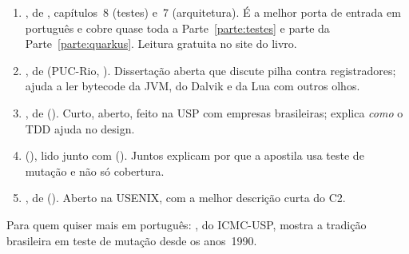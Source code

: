 \begin{enumerate}
\item {} \pt, de \citeauthor{livro:valente2020},
  capítulos~8 (testes) e~7 (arquitetura). É a melhor porta de
  entrada em português e cobre quase toda a Parte~\ref{parte:testes} e parte da Parte~\ref{parte:quarkus}.
  Leitura gratuita no site do livro.
\item {} \pt, de
  \citeauthor{paper:hazan-maquina-registradores-java} (PUC-Rio,
  \citeyear{paper:hazan-maquina-registradores-java}). Dissertação aberta que
  discute pilha contra registradores; ajuda a ler bytecode da JVM, do Dalvik
  e da Lua com outros olhos.
\item {}, de
  \citeauthor{paper:aniche-tdd-class-design-jbcs-2015}
  (\citeyear{paper:aniche-tdd-class-design-jbcs-2015}). Curto, aberto, feito
  na USP com empresas brasileiras; explica \emph{como} o TDD ajuda no design.
\item {}
  (\citeyear{paper:inozemtseva-coverage-2014}), lido junto com
  (\citeyear{paper:just-mutants-real-faults-2014}). Juntos explicam por que
  a apostila usa teste de mutação e não só cobertura.
\item {}, de
  \citeauthor{paper:hotspot-server-compiler}
  (\citeyear{paper:hotspot-server-compiler}). Aberto na USENIX,
  com a melhor descrição curta do C2.
\end{enumerate}

Para quem quiser mais em português: 
\pt, do ICMC-USP, mostra a tradição brasileira em teste de mutação desde os
anos~1990.



